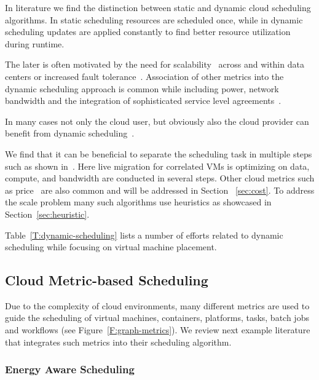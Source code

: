 \documentclass[final,5p,times,twocolumn]{elsarticle}
\begin{document}
In literature we find the distinction between static and dynamic cloud
scheduling algorithms.  In static scheduling resources are scheduled
once, while in dynamic scheduling updates are applied constantly to
find better resource utilization during runtime.


The later is often motivated by the need for
scalability~\cite{keller2014hierarchical} across and within data
centers or increased fault
tolerance~\cite{tighe2013distributed}. Association of other metrics
into the dynamic scheduling approach is common while including power,
network bandwidth and the integration of sophisticated service level
agreements~\cite{tighe2013distributed}.

In many cases not only the cloud user, but obviously also the cloud
provider can benefit from dynamic
scheduling~\cite{tighe2014integrating}.

We find that it can be beneficial to separate the scheduling task in
multiple steps such as shown in~\cite{sun2015live}. Here live
migration for correlated VMs is optimizing on data, compute, and
bandwidth are conducted in several steps. Other cloud metrics such as
price~\cite{tordsson2012cloud} are also common and will be addressed
in Section ~\ref{sec:cost}.  To address the scale problem many such
algorithms use heuristics as showcased in Section~\ref{sec:heuristic}.

Table~\ref{T:dynamic-scheduling} lists a number of efforts related to
dynamic scheduling while focusing on virtual machine placement.


%



\subsection{Cloud Metric-based Scheduling}\label{sec:vm-scheduling}

Due to the complexity of cloud environments, many different metrics
are used to guide the scheduling of virtual machines, containers,
platforms, tasks, batch jobs and workflows (see
Figure~\ref{F:graph-metrics}). We review next example literature that
integrates such metrics into their scheduling algorithm.


% 


\subsubsection{Energy Aware Scheduling}\label{sec:energy}
\end{document}
